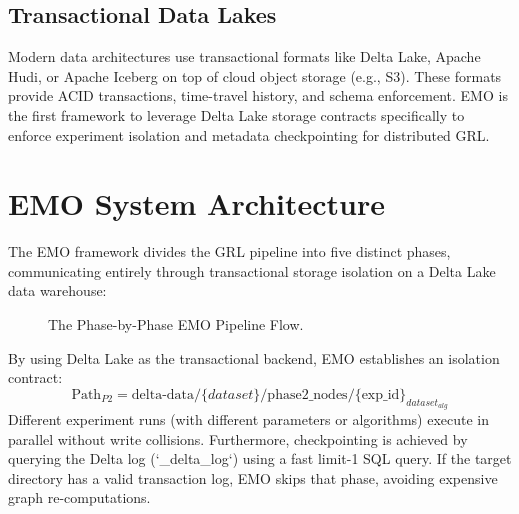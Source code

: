 \documentclass[conference,compsoc]{IEEEtran}
\begin{document}
\subsection{Transactional Data Lakes}
Modern data architectures use transactional formats like Delta Lake, Apache Hudi, or Apache Iceberg on top of cloud object storage (e.g., S3). These formats provide ACID transactions, time-travel history, and schema enforcement. EMO is the first framework to leverage Delta Lake storage contracts specifically to enforce experiment isolation and metadata checkpointing for distributed GRL.

\section{EMO System Architecture}
The EMO framework divides the GRL pipeline into five distinct phases, communicating entirely through transactional storage isolation on a Delta Lake data warehouse:

\begin{figure}[!h]
\centering
{}
\caption{The Phase-by-Phase EMO Pipeline Flow.}
\label{fig_phases}
\end{figure}

By using Delta Lake as the transactional backend, EMO establishes an isolation contract:
\begin{equation}
\text{Path}_{P2} = \text{delta-data/}\{dataset\}/\text{phase2\_nodes}/\{\text{exp\_id}\}_{dataset}_{alg}
\end{equation}
Different experiment runs (with different parameters or algorithms) execute in parallel without write collisions. Furthermore, checkpointing is achieved by querying the Delta log (`_delta_log`) using a fast limit-1 SQL query. If the target directory has a valid transaction log, EMO skips that phase, avoiding expensive graph re-computations.
\end{document}
